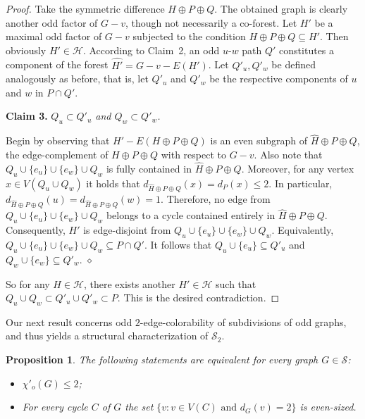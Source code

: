 \documentclass[a4paper,12pt]{article}
\newtheorem{proposition}[theorem]{Proposition}
\numberwithin{equation}{section}
\begin{document}
\begin{proof}
Take the symmetric difference $H\oplus P\oplus Q$. The obtained graph is clearly another odd factor of $G-v$, though not necessarily a co-forest. Let $H'$ be a maximal odd factor of $G-v$ subjected to the condition $H\oplus P\oplus Q\subseteq H'$. Then obviously $H'\in\mathcal{H}$. According to Claim~2, an odd $u$-$w$ path $Q'$ constitutes a component of the forest $\widehat{H'}=G-v-E(H')$. Let $Q'_u,Q'_w$ be defined analogously as before, that is, let $Q'_u$ and $Q'_w$ be the respective components of $u$ and $w$ in $P\cap Q'$.

\bigskip

\noindent \textbf{Claim 3.} \textit{$Q_u\subset Q'_u$ and $Q_w\subset Q'_w$.}

\medskip

\noindent Begin by observing that $H'-E(H\oplus P\oplus Q)$ is an even subgraph of $\widehat{H}\oplus P\oplus Q$, the edge-complement of $H\oplus P\oplus Q$ with respect to $G-v$. Also note that $Q_u\cup\{e_u\}\cup \{e_w\}\cup Q_w$ is  fully contained in $\widehat{H}\oplus P\oplus Q$. Moreover, for any vertex $x\in V(Q_u\cup Q_w)$ it holds that $d_{\widehat{H}\oplus P\oplus Q}(x)=d_P(x)\leq2$. In particular, $d_{\widehat{H}\oplus P\oplus Q}(u)=d_{\widehat{H}\oplus P\oplus Q}(w)=1$. Therefore, no edge from $Q_u\cup\{e_u\}\cup \{e_w\}\cup Q_w$ belongs to a cycle contained entirely in $\widehat{H}\oplus P\oplus Q$. Consequently, $H'$ is edge-disjoint from $Q_u\cup\{e_u\}\cup \{e_w\}\cup Q_w$. Equivalently, $Q_u\cup\{e_u\}\cup \{e_w\}\cup Q_w\subseteq P\cap Q'$. It follows that $Q_u\cup\{e_u\}\subseteq Q'_u$ and $Q_w\cup\{e_w\}\subseteq Q'_w$. \hfill$\diamond$

\bigskip

So for any $H\in\mathcal{H}$, there exists another $H'\in\mathcal{H}$ such that $Q_u\cup Q_w\subset Q'_u\cup Q'_w \subset P$.
This is the desired contradiction.
\end{proof}



Our next result concerns odd $2$-edge-colorability of subdivisions of odd graphs, and thus yields a structural characterization of $\mathcal{S}_2$.

\begin{proposition} The following statements are equivalent for every graph $G\in \mathcal{S}$:
\begin{itemize}
\item[$(i)$] $\chi'_o(G)\leq2$;
\item[$(ii)$] For every cycle $C$ of $G$ the set $\{v:v\in V(C) \text{ and } d_G(v)=2\}$ is even-sized.
\end{itemize}
\end{proposition}
\end{document}
